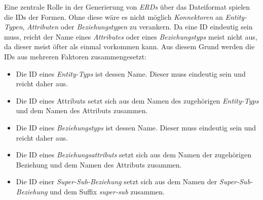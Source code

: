 \hon{}

\noindent
Eine zentrale Rolle in der Generierung von \textit{ERDs} über das Dateiformat spielen die IDs der Formen. Ohne diese wäre es nicht möglich \textit{Konnektoren} an \textit{Entity-Typen}, \textit{Attributen} oder \textit{Beziehungstypen} zu verankern. Da eine ID eindeutig sein muss, reicht der Name eines \textit{Attributes} oder eines \textit{Beziehungstyps} meist nicht aus, da dieser meist öfter als einmal vorkommen kann. Aus diesem Grund werden die IDs aus mehreren Faktoren zusammengesetzt:
\begin{itemize}
	\item Die ID eines \textit{Entity-Typs} ist dessen Name. Dieser muss eindeutig sein und reicht daher aus.
	\item Die ID eines Attributs setzt sich aus dem Namen des zugehörigen \textit{Entity-Typs} und dem Namen des Attributs zusammen.
	\item Die ID eines \textit{Beziehungstyps} ist dessen Name. Dieser muss eindeutig sein und reicht daher aus.
	\item Die ID eines \textit{Beziehungsattributs} setzt sich aus dem Namen der zugehörigen Beziehung und dem Namen des Attributs zusammen.
	\item Die ID einer \textit{Super-Sub-Beziehung} setzt sich aus dem Namen der \textit{Super-Sub-Beziehung} und dem Suffix \textit{super-sub} zusammen.
\end{itemize} 


